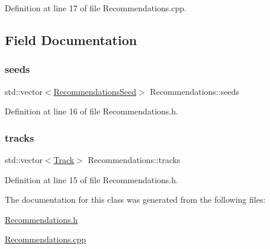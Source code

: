 Definition at line 17 of file Recommendations.\+cpp.



\subsection{Field Documentation}
\mbox{\label{class_recommendations_a372f6b563c4fa0db77ed801bf86a859f}} 
\subsubsection{\texorpdfstring{seeds}{seeds}}
{\footnotesize\ttfamily std\+::vector$<$\mbox{\hyperlink{class_recommendations_seed}{Recommendations\+Seed}}$>$ Recommendations\+::seeds\hspace{0.3cm}{\ttfamily [private]}}



Definition at line 16 of file Recommendations.\+h.

\mbox{\label{class_recommendations_ab77429465c6b6d3ee0f0abb3b357e268}} 
\subsubsection{\texorpdfstring{tracks}{tracks}}
{\footnotesize\ttfamily std\+::vector$<$\mbox{\hyperlink{class_track}{Track}}$>$ Recommendations\+::tracks\hspace{0.3cm}{\ttfamily [private]}}



Definition at line 15 of file Recommendations.\+h.



The documentation for this class was generated from the following files\+:\begin{DoxyCompactItemize}
\item 
\mbox{\hyperlink{_recommendations_8h}{Recommendations.\+h}}\item 
\mbox{\hyperlink{_recommendations_8cpp}{Recommendations.\+cpp}}\end{DoxyCompactItemize}
